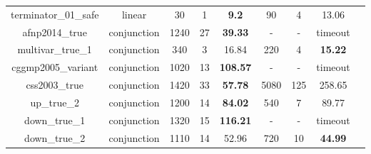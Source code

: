 \begin{table}[t]
\begin{tabular}{l c | c c c | c c c | c }
\multicolumn{1}{|c|}{terminator\_01\_safe}         		&linear 		&30 &1 &\textbf{9.2}  			&90  &4  &13.06  			&\multicolumn{1}{|c|}{\cmark} \\
\multicolumn{1}{|c|}{afnp2014\_true}         			&conjunction	&1240 &27 &\textbf{39.33}		&- &- &timeout  		&\multicolumn{1}{|c|}{\xmark} \\
\multicolumn{1}{|c|}{multivar\_true\_1}         		&conjunction 	&340 &3 &16.84  				&220 &4   &\textbf{15.22}  	&\multicolumn{1}{|c|}{\cmark} \\
\multicolumn{1}{|c|}{cggmp2005\_variant}   				&conjunction 	&1020 &13 &\textbf{108.57}		&- &- &timeout  		&\multicolumn{1}{|c|}{\cmark} \\
\multicolumn{1}{|c|}{css2003\_true}         			&conjunction 	&1420 &33 &\textbf{57.78}		&5080 &125 &258.65  		&\multicolumn{1}{|c|}{\cmark} \\
\multicolumn{1}{|c|}{up\_true\_2}         				&conjunction 	&1200 &14 &\textbf{84.02}  		&540 &7   &89.77  			&\multicolumn{1}{|c|}{\cmark} \\
\multicolumn{1}{|c|}{down\_true\_1}         			&conjunction 	&1320  &15 &\textbf{116.21}  	&-  &-  &timeout  		&\multicolumn{1}{|c|}{\cmark} \\
\multicolumn{1}{|c|}{down\_true\_2}         			&conjunction 	&1110 &14 &52.96  				&720 &10   &\textbf{44.99}  &\multicolumn{1}{|c|}{\cmark} \\

\hline
\end{tabular}
\label{tbl:stats}
\end{table}


